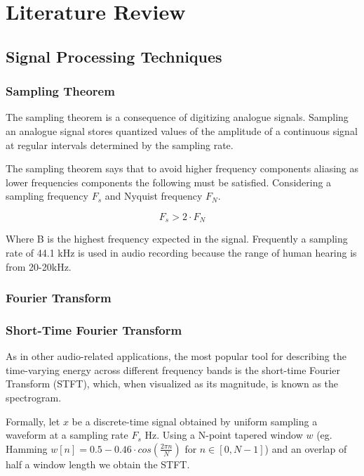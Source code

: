  

\chapter{Literature Review}
\label{ch:review}
\vspace{2em}

\section{Signal Processing Techniques}
\subsection{Sampling Theorem}

The sampling theorem is a consequence of digitizing analogue signals. Sampling
an analogue signal stores quantized values of the amplitude of a continuous
signal at regular intervals determined by the sampling rate.

The sampling theorem says that to avoid higher frequency components aliasing as
lower frequencies components the following must be satisfied. Considering a
sampling frequency $F_{s}$ and Nyquist frequency $F_{N}$.

\begin{equation}
  F_{s} > 2\cdot F_{N}
\end{equation}

Where B is the highest frequency expected in the signal. Frequently a sampling
rate of 44.1 kHz is used in audio recording because the range of human hearing
is from 20-20kHz.


\subsection{Fourier Transform}
\subsection{Short-Time Fourier Transform}

As in other audio-related applications, the most popular tool for describing the
time-varying energy across different frequency bands is the short-time Fourier
Transform (STFT), which, when visualized as its magnitude, is known as the
spectrogram.

Formally, let $x$ be a discrete-time signal obtained by uniform sampling a
waveform at a sampling rate $F_{s}$ Hz. Using a N-point tapered window $w$ (eg.
Hamming $w[n] = 0.5-0.46\cdot cos(\frac{2\pi n}{N})$ for
$n\in\left[0,N-1\right]$) and an overlap of half a window length we obtain the
STFT.

